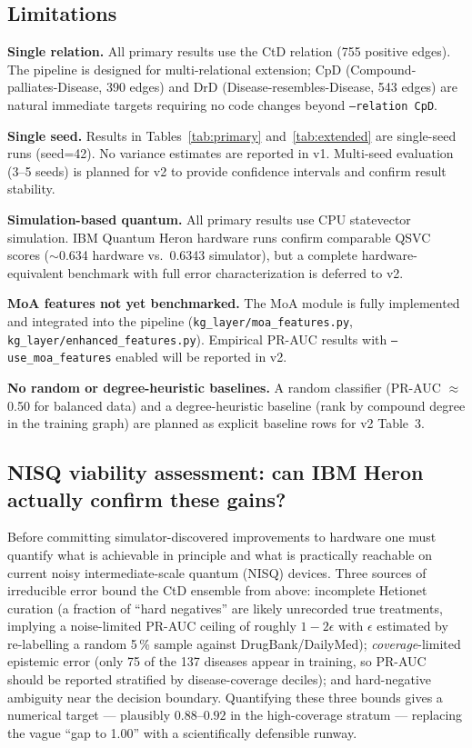 \documentclass[twocolumn,10pt]{article}
\begin{document}
\subsection{Limitations}

\textbf{Single relation.} All primary results use the CtD relation (755 positive edges). The pipeline is designed for multi-relational extension; CpD (Compound-palliates-Disease, 390 edges) and DrD (Disease-resembles-Disease, 543 edges) are natural immediate targets requiring no code changes beyond \texttt{--relation CpD}.

\textbf{Single seed.} Results in Tables~\ref{tab:primary} and~\ref{tab:extended} are single-seed runs (seed=42). No variance estimates are reported in v1. Multi-seed evaluation (3--5 seeds) is planned for v2 to provide confidence intervals and confirm result stability.

\textbf{Simulation-based quantum.} All primary results use CPU statevector simulation. IBM Quantum Heron hardware runs confirm comparable QSVC scores (${\sim}$0.634 hardware vs.\ 0.6343 simulator), but a complete hardware-equivalent benchmark with full error characterization is deferred to v2.

\textbf{MoA features not yet benchmarked.} The MoA module is fully implemented and integrated into the pipeline (\texttt{kg\_layer/moa\_features.py}, \texttt{kg\_layer/enhanced\_features.py}). Empirical PR-AUC results with \texttt{--use\_moa\_features} enabled will be reported in v2.

\textbf{No random or degree-heuristic baselines.} A random classifier (PR-AUC $\approx$ 0.50 for balanced data) and a degree-heuristic baseline (rank by compound degree in the training graph) are planned as explicit baseline rows for v2 Table~3.

\subsection{NISQ viability assessment: can IBM Heron actually confirm these gains?}

Before committing simulator-discovered improvements to hardware one must quantify what is achievable in principle and what is practically reachable on current noisy intermediate-scale quantum (NISQ) devices. Three sources of irreducible error bound the CtD ensemble from above: incomplete Hetionet curation (a fraction of ``hard negatives'' are likely unrecorded true treatments, implying a noise-limited PR-AUC ceiling of roughly $1 - 2\epsilon$ with $\epsilon$ estimated by re-labelling a random 5\,\% sample against DrugBank/DailyMed); \emph{coverage}-limited epistemic error (only 75 of the 137 diseases appear in training, so PR-AUC should be reported stratified by disease-coverage deciles); and hard-negative ambiguity near the decision boundary. Quantifying these three bounds gives a numerical target --- plausibly $0.88$--$0.92$ in the high-coverage stratum --- replacing the vague ``gap to 1.00'' with a scientifically defensible runway.
\end{document}
